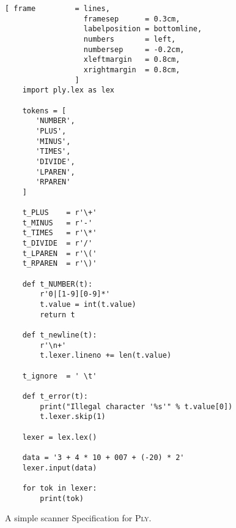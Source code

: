 \begin{figure}[!ht]
\centering
\begin{Verbatim}[ frame         = lines, 
                  framesep      = 0.3cm, 
                  labelposition = bottomline,
                  numbers       = left,
                  numbersep     = -0.2cm,
                  xleftmargin   = 0.8cm,
                  xrightmargin  = 0.8cm,
                ]
    import ply.lex as lex
    
    tokens = [
       'NUMBER',
       'PLUS',
       'MINUS',
       'TIMES',
       'DIVIDE',
       'LPAREN',
       'RPAREN'
    ]
    
    t_PLUS    = r'\+'
    t_MINUS   = r'-'
    t_TIMES   = r'\*'
    t_DIVIDE  = r'/'
    t_LPAREN  = r'\('
    t_RPAREN  = r'\)'
    
    def t_NUMBER(t):
        r'0|[1-9][0-9]*'
        t.value = int(t.value)
        return t
    
    def t_newline(t):
        r'\n+'
        t.lexer.lineno += len(t.value)
    
    t_ignore  = ' \t'
    
    def t_error(t):
        print("Illegal character '%s'" % t.value[0])
        t.lexer.skip(1)
    
    lexer = lex.lex()
    
    data = '3 + 4 * 10 + 007 + (-20) * 2'
    lexer.input(data)
    
    for tok in lexer:
        print(tok)
\end{Verbatim}
\vspace*{-0.3cm}
\caption{A simple scanner Specification for \textsc{Ply}.}
\label{fig:Ply-Example.ipynb}
\end{figure}

